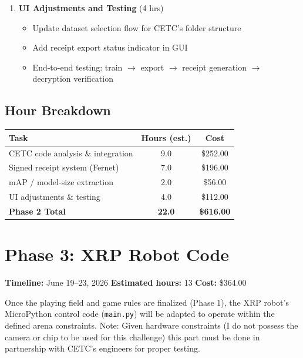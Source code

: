 \documentclass[a4paper]{article}
\begin{document}
\begin{enumerate}[leftmargin=*]
    \item \textbf{UI Adjustments and Testing} (4 hrs)
    \begin{itemize}
        \item Update dataset selection flow for CETC's folder structure
        \item Add receipt export status indicator in GUI
        \item End-to-end testing: train $\rightarrow$ export $\rightarrow$ receipt generation $\rightarrow$ decryption verification
    \end{itemize}
\end{enumerate}

\subsection*{Hour Breakdown}

\begin{center}
\begin{tabular}{lcc}
\toprule
\textbf{Task} & \textbf{Hours (est.)} & \textbf{Cost} \\
\midrule
CETC code analysis \& integration & 9.0 & \$252.00 \\
Signed receipt system (Fernet) & 7.0 & \$196.00 \\
mAP / model-size extraction & 2.0 & \$56.00 \\
UI adjustments \& testing & 4.0 & \$112.00 \\
\midrule
\textbf{Phase 2 Total} & \textbf{22.0} & \textbf{\$616.00} \\
\bottomrule
\end{tabular}
\end{center}

\section*{Phase 3: XRP Robot Code}

\noindent\textbf{Timeline:} June 19--23, 2026 \hfill \textbf{Estimated hours:} 13 \hfill \textbf{Cost:} \$364.00

\vspace{0.5em}

Once the playing field and game rules are finalized (Phase 1), the XRP robot's MicroPython control code (\texttt{main.py}) will be adapted to operate within the defined arena constraints. Note: Given hardware constraints (I do not possess the camera or chip to be used for this challenge) this part must be done in partnership with CETC's engineers for proper testing.
\end{document}
